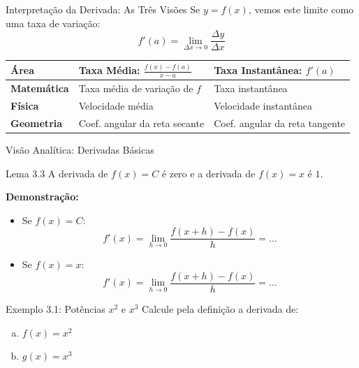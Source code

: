 \documentclass[10pt, aspectratio=169]{beamer}
\begin{document}
\begin{frame}{Interpretação da Derivada: As Três Visões}
  Se $y = f(x)$, vemos este limite como uma taxa de variação:
  \[
    f'(a) = \lim_{\Delta x \to 0} \frac{\Delta y}{\Delta x}
  \]
  
  \begin{table}
    \centering
    \begin{tabular}{l l l}
      \toprule
      \textbf{Área} & \textbf{Taxa Média: } $\frac{f(x)-f(a)}{x-a}$ & \textbf{Taxa Instantânea: } $f'(a)$ \\
      \midrule
      \textbf{Matemática} & Taxa média de variação de $f$ & Taxa instantânea \\
      \textbf{Física} & Velocidade média & Velocidade instantânea \\
      \textbf{Geometria} & Coef. angular da reta secante & Coef. angular da reta tangente \\
      \bottomrule
    \end{tabular}
  \end{table}
\end{frame}

\begin{frame}{Visão Analítica: Derivadas Básicas}
  \begin{block}{Lema 3.3}
    A derivada de $f(x) = C$ é zero e a derivada de $f(x) = x$ é $1$.
  \end{block}

  \vspace{0.3cm}
  \textbf{Demonstração:}
  \begin{itemize}
    \item Se $f(x) = C$:
      \[ f'(x) = \lim_{h \to 0} \frac{f(x+h) - f(x)}{h} = \dots \]
    \item Se $f(x) = x$:
      \[ f'(x) = \lim_{h \to 0} \frac{f(x+h) - f(x)}{h} = \dots \]
  \end{itemize}
\end{frame}

\begin{frame}{Exemplo 3.1: Potências $x^2$ e $x^3$}
  Calcule pela definição a derivada de:
  
  \vspace{0.3cm}
  \begin{enumerate}[(a)]
    \item $f(x) = x^2$
    \vspace{2cm}
    \item $g(x) = x^3$
  \end{enumerate}
\end{frame}
\end{document}
